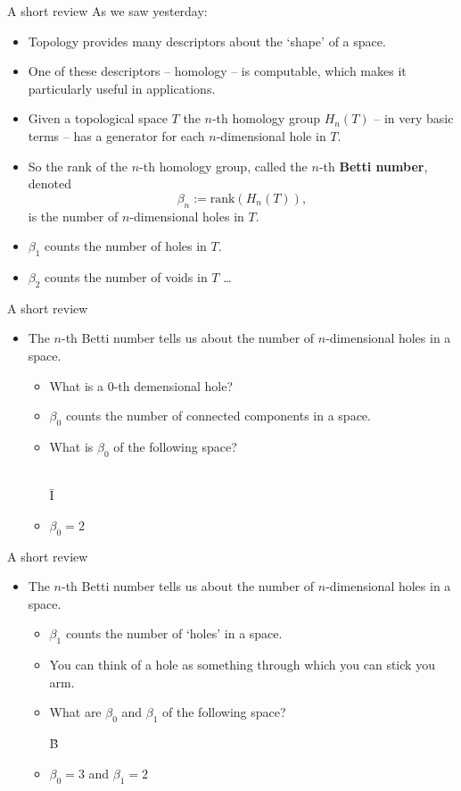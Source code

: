 \begin{frame}{A short review}
As we saw yesterday:
\begin{itemize}
\item<2-> Topology provides many descriptors about the `shape' of a space.
\item<3-> One of these descriptors -- homology -- is computable, which makes it particularly useful in applications.
\item<4-> Given a topological space $T$ the $n$-th homology group $H_n(T)$ -- in very basic terms -- has a generator for each $n$-dimensional hole in $T$. 
\item<5-> So the rank of the $n$-th homology group, called the $n$-th \textbf{Betti number}, denoted
	\[
	\beta_n := \textrm{rank}(H_n(T)),
	\]
is the number of $n$-dimensional holes in $T$.
\item<6-> $\beta_1$ counts the number of holes in $T$.
\item<7-> $\beta_2$ counts the number of voids in $T$ \ldots
\end{itemize}
\end{frame}
\begin{frame}{A short review}
\begin{itemize}
\item The $n$-th Betti number tells us about the number of $n$-dimensional holes in a space.
	\begin{itemize}
	\item<1-> What is a $0$-th demensional hole?
	\item<2-> $\beta_0$ counts the number of connected components in a space.
	\item<3-> What is $\beta_0$ of the following space?\\
	\
	\begin{center}
	{\fontsize{50pt}{1pt}\selectfont \={I}}
	\end{center}
	\item<4-> $\beta_0 = 2$
	\end{itemize}
\end{itemize}
\end{frame}
\begin{frame}{A short review}
\begin{itemize}
\item The $n$-th Betti number tells us about the number of $n$-dimensional holes in a space.
	\begin{itemize}
	\item<1-> $\beta_1$ counts the number of `holes' in a space.
	\item<2-> You can think of a hole as something through which you can stick you arm.
	\item<3-> What are $\beta_0$ and $\beta_1$ of the following space?
	\begin{center}
	{\fontsize{50pt}{12pt}\selectfont \"{B}}
	\end{center}	
	\item<4-> $\beta_0 = 3$ and $\beta_1 = 2$
	\end{itemize}
\end{itemize}
\end{frame}
